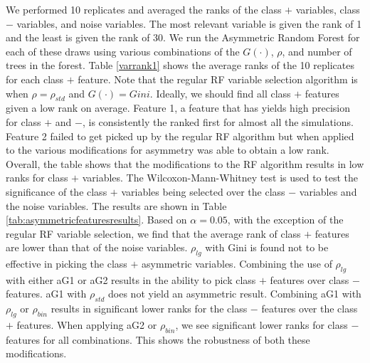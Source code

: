 \documentclass[twoside,11pt]{article}
\begin{document}
We performed 10 replicates and averaged the ranks of the class $+$ variables, class $-$ variables, and noise variables. The most relevant variable is given the rank of 1 and the least is given the rank of 30. We run the Asymmetric Random Forest for each of these draws using various combinations of the $G(\cdot)$, $\rho$, and number of trees in the forest. Table \ref{varrank1} shows the average ranks of the 10 replicates for each class $+$ feature. Note that the regular RF variable selection algorithm is when $\rho=\rho_{std}$ and $G(\cdot)=Gini$. Ideally, we should find all class $+$ features given a low rank on average. Feature 1, a feature that has yields high precision for class $+$ and $-$, is consistently the ranked first for almost all the simulations. Feature 2 failed to get picked up by the regular RF algorithm but when applied to the various modifications for asymmetry was able to obtain a low rank. Overall, the table shows that the modifications to the RF algorithm results in low ranks for class $+$ variables. The Wilcoxon-Mann-Whitney test is used to test the significance of the class $+$ variables being selected over the class $-$ variables and the noise variables. The results are shown in Table \ref{tab:asymmetricfeaturesresults}. Based on $\alpha=0.05$, with the exception of the regular RF variable selection, we find that the average rank of class $+$ features are lower than that of the noise variables. $\rho_{lg}$ with Gini is found not to be effective in picking the class $+$ asymmetric variables. Combining the use of $\rho_{lg}$ with either aG1 or aG2 results in the ability to pick class $+$ features over class $-$ features. aG1 with $\rho_{std}$ does not yield an asymmetric result. Combining aG1 with $\rho_{lg}$ or $\rho_{bin}$ results in significant lower ranks for the class $-$ features over the class $+$ features. When applying aG2 or $\rho_{bin}$, we see significant lower ranks for class $-$ features for all combinations. This shows the robustness of both these modifications. 
\end{document}
